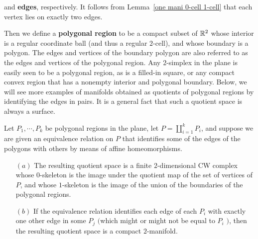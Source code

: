 and \textbf{edges}, respectively. It follows from Lemma~\ref{one mani 0-cell 1-cell} that each vertex lies on exactly two edges.\par
Then we define a \textbf{polygonal region} to be a compact subset of $\mathbb{R}^2$ whose interior is a regular coordinate ball (and thus a regular $2$-cell), and whose boundary is a polygon. The edges and vertices of the boundary polygon are also referred to as the edges and vertices of the polygonal region. Any $2$-simplex in the plane is easily seen to be a polygonal region, as is a filled-in square, or any compact convex region that has a nonempty interior and polygonal boundary. Below, we will see more examples of manifolds obtained as quotients of polygonal regions by identifying the edges in pairs. It is a general fact that such a quotient space is always a surface.
\begin{proposition}\label{polygonal quotient}
Let $P_1,\cdots,P_k$ be polygonal regions in the plane, let $P=\coprod_{i=1}^kP_i$, and suppose we are given an equivalence relation on $P$ that identifies some of the edges of the polygons with others by means of affine homeomorphisms.
\begin{itemize}
\item[$(a)$] The resulting quotient space is a finite $2$-dimensional CW complex whose $0$-skeleton is the image under the quotient map of the set of vertices of $P$, and whose $1$-skeleton is the image of the union of the boundaries of the polygonal regions.
\item[$(b)$] If the equivalence relation identifies each edge of each $P_i$ with exactly one other edge in some $P_j$ $($which might or might not be equal to $P_i$ $)$, then the resulting quotient space is a compact $2$-manifold.
\end{itemize}
\end{proposition}
